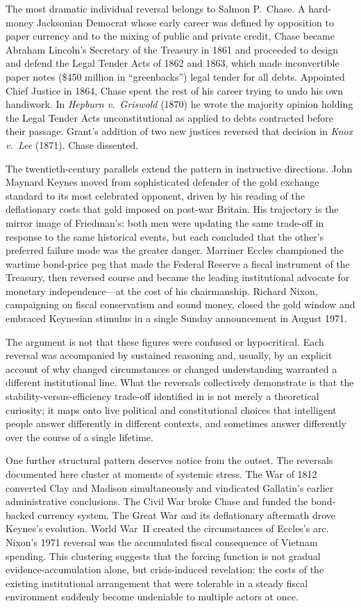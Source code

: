 \documentclass[12pt]{article}
\begin{document}
The most dramatic individual reversal belongs to Salmon P.\ Chase.  A
hard-money Jacksonian Democrat whose early career was defined by
opposition to paper currency and to the mixing of public and private
credit, Chase became Abraham Lincoln's Secretary of the Treasury in 1861
and proceeded to design and defend the Legal Tender Acts of 1862 and
1863, which made inconvertible paper notes (\$450 million in
``greenbacks'') legal tender for all debts.  Appointed Chief Justice
in 1864, Chase spent the rest of his career trying to undo his own
handiwork.  In \textit{Hepburn v.\ Griswold} (1870) he wrote the
majority opinion holding the Legal Tender Acts unconstitutional as
applied to debts contracted before their passage.  Grant's addition of
two new justices reversed that decision in \textit{Knox v.\ Lee} (1871).
Chase dissented.

The twentieth-century parallels extend the pattern in instructive
directions.  John Maynard Keynes moved from sophisticated defender of
the gold exchange standard to its most celebrated opponent, driven by
his reading of the deflationary costs that gold imposed on post-war
Britain.  His trajectory is the mirror image of Friedman's: both men
were updating the same trade-off in response to the same historical
events, but each concluded that the other's preferred failure mode was
the greater danger.  Marriner Eccles championed the wartime bond-price
peg that made the Federal Reserve a fiscal instrument of the Treasury,
then reversed course and became the leading institutional advocate for
monetary independence---at the cost of his chairmanship.  Richard
Nixon, campaigning on fiscal conservatism and sound money, closed the
gold window and embraced Keynesian stimulus in a single Sunday
announcement in August 1971.

The argument is not that these figures were confused or hypocritical.
Each reversal was accompanied by sustained reasoning and, usually, by
an explicit account of why changed circumstances or changed understanding
warranted a different institutional line.  What the reversals collectively
demonstrate is that the stability-versus-efficiency trade-off identified
in \citet{Sargent2011} is not merely a theoretical curiosity; it maps
onto live political and constitutional choices that intelligent people
answer differently in different contexts, and sometimes answer differently
over the course of a single lifetime.

One further structural pattern deserves notice from the outset.  The
reversals documented here cluster at moments of systemic stress.  The
War of 1812 converted Clay and Madison simultaneously and vindicated
Gallatin's earlier administrative conclusions.  The Civil War broke
Chase and funded the bond-backed currency system.  The Great War and its
deflationary aftermath drove Keynes's evolution.  World War~II created
the circumstances of Eccles's arc.  Nixon's 1971 reversal was the
accumulated fiscal consequence of Vietnam spending.  This clustering
suggests that the forcing function is not gradual evidence-accumulation
alone, but crisis-induced revelation: the costs of the existing
institutional arrangement that were tolerable in a steady fiscal
environment suddenly become undeniable to multiple actors at once.
\end{document}
